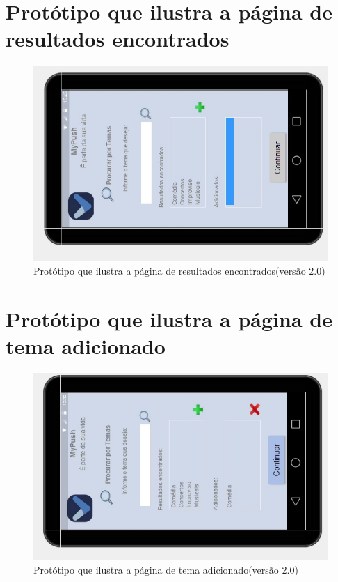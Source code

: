 \begin{apendicesenv}
    \pagebreak
      \section*{Protótipo que ilustra a página de resultados encontrados}

    \begin{figure}[!htbp]
      \centering
      \includegraphics[scale=0.9, angle=-90]{editaveis/figuras/prototipo_alta_fidelidade_v2/2_3}
      \caption{Protótipo que ilustra a página de resultados encontrados(versão 2.0)}
      \label{v2}
    \end{figure}
    
    \pagebreak
      \section*{Protótipo que ilustra a página de tema adicionado}

    \begin{figure}[!htbp]
      \centering
      \includegraphics[scale=0.9, angle=-90]{editaveis/figuras/prototipo_alta_fidelidade_v2/2_4}
      \caption{Protótipo que ilustra a página de tema adicionado(versão 2.0)}
      \label{v2}
    \end{figure}
    

\end{apendicesenv}
